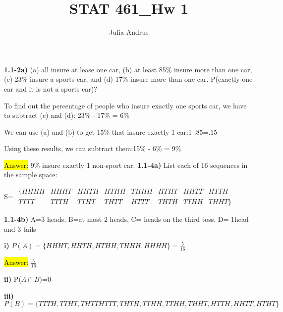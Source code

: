 \documentclass{article}
\title{STAT 461\_Hw 1}
\author{Julia Andrus}
\date{}
\begin{document}
\maketitle 



\textbf{ 1.1-2a)}  (a) all insure at lease one car, (b) at least 85\% insure more than one car, (c) 23\% insure a sports car, and (d) 17\% insure more than one car. P(exactly one car and it is not a sports car)?

\vspace{2mm}
To find out the percentage of people who insure exactly one sports car, we have to subtract (c) and (d):  23\% - 17\% = 6\%

\vspace{2mm}
We can use (a) and (b) to get 15\% that insure exactly 1 car:1-.85=.15
\vspace{2mm}

Using these results, we can subtract them:15\% - 6\% = 9\%
\vspace{2mm}

\hl{Answer:} 9\% insure exactly 1 non-sport car.
\newpage
\textbf{ 1.1-4a)}  List each of 16 sequences in the sample space:

\vspace{3mm}

S=
$\begin{matrix}

\{HHHH & HHHT & HHTH & HTHH &THHH & HTHT & HHTT & HTTH \\
TTTT & TTTH & TTHT & THTT & HTTT&THTH & TTHH&THHT\}
\end{matrix}$

\vspace{3mm}
\textbf{ 1.1-4b)}  A=3 heads, B=at most 2 heads, C= heads on the third toss, D= 1head and 3 tails

\vspace{3mm}

\textbf{i)} $P(A)=\{HHHT, HHTH, HTHH,THHH, HHHH\}=\frac{5}{16}$
\vspace{2mm}

\hl{Answer:} $\frac{5}{16}$

\vspace{3mm}

\textbf{ii)} P($A\cap B$)=0

\vspace{3mm}

\textbf{iii)} $P(B)=\{TTTH, TTHT, THTT HTTT, THTH, TTHH, TTHH, THHT, HTTH, HHTT, HTHT\}$
\end{document}
